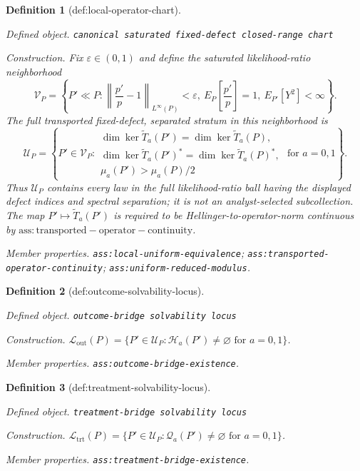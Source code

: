 \documentclass{article}
\newtheorem{definition}{Definition}
\begin{document}
\begin{definition}[def:local-operator-chart]\label{def:local-operator-chart}
\par\smallskip\noindent\emph{Defined object.} \texttt{canonical saturated fixed-\allowbreak{}defect closed-\allowbreak{}range chart}
\par\smallskip\noindent\emph{Construction.} Fix \(\varepsilon\in(0,1)\) and define the saturated likelihood-ratio neighborhood
\[
\mathcal V_P=\left\{P'\ll P:\left\|\frac{p'}p-1\right\|_{L^\infty(P)}<\varepsilon,
\ E_P\!\left[\frac{p'}p\right]=1,\ E_{P'}[Y^2]<\infty\right\}.
\]
The full transported fixed-defect, separated stratum in this neighborhood is
\[
\mathcal U_P=\left\{P'\in\mathcal V_P:
\begin{array}{l}
\dim\ker\widetilde T_a(P')=\dim\ker\widetilde T_a(P),\\
\dim\ker\widetilde T_a(P')^*=\dim\ker\widetilde T_a(P)^*,\\
\mu_a(P')>\mu_a(P)/2
\end{array}
\text{ for }a=0,1\right\}.
\]
Thus \(\mathcal U_P\) contains every law in the full likelihood-ratio ball having the displayed defect indices and spectral separation; it is not an analyst-selected subcollection.  The map \(P'\mapsto\widetilde T_a(P')\) is required to be Hellinger-to-operator-norm continuous by \(\mathrm{ass:transported-operator-continuity}\).
\par\smallskip\noindent\emph{Member properties.} \texttt{ass:\allowbreak{}local-\allowbreak{}uniform-\allowbreak{}equivalence}; \texttt{ass:\allowbreak{}transported-\allowbreak{}operator-\allowbreak{}continuity}; \texttt{ass:\allowbreak{}uniform-\allowbreak{}reduced-\allowbreak{}modulus}.
\end{definition}

\begin{definition}[def:outcome-solvability-locus]\label{def:outcome-solvability-locus}
\par\smallskip\noindent\emph{Defined object.} \texttt{outcome-\allowbreak{}bridge solvability locus}
\par\smallskip\noindent\emph{Construction.} \(\mathcal L_{\mathrm{out}}(P)=\{P'\in\mathcal U_P:\mathcal H_a(P')\neq\varnothing\text{ for }a=0,1\}\).
\par\smallskip\noindent\emph{Member properties.} \texttt{ass:\allowbreak{}outcome-\allowbreak{}bridge-\allowbreak{}existence}.
\end{definition}

\begin{definition}[def:treatment-solvability-locus]\label{def:treatment-solvability-locus}
\par\smallskip\noindent\emph{Defined object.} \texttt{treatment-\allowbreak{}bridge solvability locus}
\par\smallskip\noindent\emph{Construction.} \(\mathcal L_{\mathrm{trt}}(P)=\{P'\in\mathcal U_P:\mathcal Q_a(P')\neq\varnothing\text{ for }a=0,1\}\).
\par\smallskip\noindent\emph{Member properties.} \texttt{ass:\allowbreak{}treatment-\allowbreak{}bridge-\allowbreak{}existence}.
\end{definition}
\end{document}
